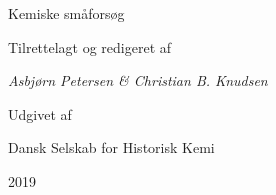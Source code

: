 
\begin{center}
\begin{bf}
\Huge{Kemiske småforsøg}
\end{bf}

\hfill

\hfill

Tilrettelagt og redigeret af

\textit{Asbjørn Petersen \& Christian B. Knudsen}

\vspace*{\fill}
Udgivet af

Dansk Selskab for Historisk Kemi

2019
\end{center}
